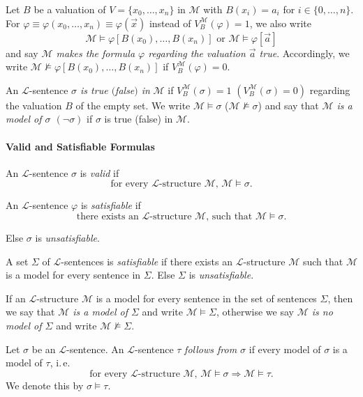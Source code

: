 Let $B$ be a valuation of $V = \lbrace x_0, \ldots, x_n \rbrace$ in $\mathcal{M}$ with $B(x_i)=a_i$ for $i \in \lbrace 0, \ldots, n \rbrace$. For $\varphi \equiv \varphi(x_0, \ldots, x_n)\equiv \varphi(\overrightarrow{x}) $ instead of $V_B^\mathcal{M}(\varphi) = 1$, we also write
\[\mathcal{M} \vDash \varphi[B(x_0), \ldots, B(x_n) ] \text{ or } \mathcal{M} \vDash \varphi[\overrightarrow{a}] \]
and say \textit{$\mathcal{M}$ makes the formula $\varphi$ regarding the valuation $\overrightarrow{a}$ true}. Accordingly, we write $\mathcal{M} \nvDash \varphi[B(x_0), \ldots, B(x_n) ]$ if $V_B^\mathcal{M}(\varphi) = 0$.

An $\mathcal{L}$-sentence \textit{$\sigma$ is true $($false$)$ in} \textit{$\mathcal{M}$} if $V_B^\mathcal{M}(\sigma) = 1$ $(V_B^\mathcal{M}(\sigma) = 0)$ regarding the valuation $B$ of the empty set. We write $\mathcal{M} \vDash \sigma$ ($\mathcal{M} \nvDash \sigma$) and say that \textit{$\mathcal{M}$ is a model of $\sigma$ $(\lnot \sigma)$} if $\sigma$ is true (false) in $\mathcal{M}$.

\paragraph{Valid and Satisfiable Formulas}
An $\mathcal{L}$-sentence $\sigma$ is \textit{valid} if 
\[\text{for every }\mathcal{L}\text{-structure }\mathcal{M}\text{, } \mathcal{M} \vDash \sigma. \] 

An $\mathcal{L}$-sentence $\varphi$ is \textit{satisfiable} if 
\[ \text{there exists an } \mathcal{L}\text{-structure }\mathcal{M} \text{, such that }\mathcal{M} \vDash \sigma . \]

Else $\sigma$ is \textit{unsatisfiable}.

A set $\Sigma$ of $\mathcal{L}$-sentences is \textit{satisfiable} if there exists an $\mathcal{L}$-structure $\mathcal{M}$ such that $\mathcal{M}$ is a model for every sentence in $\Sigma$. Else $\Sigma$ is \textit{unsatisfiable}.

If an $\mathcal{L}$-structure $\mathcal{M}$ is a model for every sentence in the set of sentences $\Sigma$, then we say that \textit{$\mathcal{M}$ is a model of $\Sigma$} and write $\mathcal{M} \vDash \Sigma$, otherwise we say \textit{$\mathcal{M}$ is no model of $\Sigma$} and write $\mathcal{M} \nvDash \Sigma$.

Let $\sigma$ be an $\mathcal{L}$-sentence. An $\mathcal{L}$-sentence $\tau$ \textit{follows from $\sigma$} if every model of $\sigma$ is a model of $\tau$, i.\,e.\@
\[ \text{for every }\mathcal{L}\text{-structure }\mathcal{M}\text{, } \mathcal{M} \vDash \sigma \Rightarrow \mathcal{M} \vDash \tau. \]
We denote this by $ \sigma \vDash \tau$.

